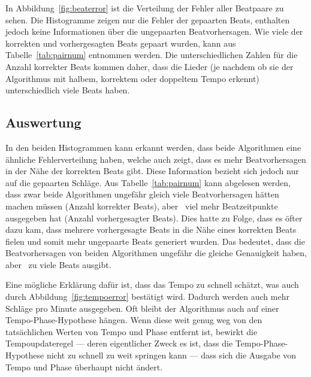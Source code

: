{{		In Abbildung~\ref{fig:beaterror} ist die Verteilung der Fehler aller Beatpaare zu sehen.
		Die Histogramme zeigen nur die Fehler der gepaarten Beats,
			enthalten jedoch keine Informationen über die ungepaarten Beatvorhersagen.
		Wie viele der korrekten und vorhergesagten Beats gepaart wurden,
			kann aus Tabelle~\ref{tab:pairnum} entnommen werden.
		Die unterschiedlichen Zahlen für die Anzahl korrekter Beats kommen daher,
			dass die Lieder
			(je nachdem ob sie der Algorithmus mit halbem, korrektem oder doppeltem Tempo erkennt)
			unterschiedlich viele Beats haben.
	}

	\subsection{Auswertung}
	{
		In den beiden Histogrammen kann erkannt werden,
			dass beide Algorithmen eine ähnliche Fehlerverteilung haben,
			welche auch zeigt,
			dass es mehr Beatvorhersagen in der Nähe der korrekten Beats gibt.
		Diese Information bezieht sich jedoch nur auf die gepaarten Schläge.
		Aus Tabelle~\ref{tab:pairnum} kann abgelesen werden,
			dass zwar beide Algorithmen ungefähr gleich viele Beatvorhersagen hätten machen müssen (Anzahl korrekter Beats),
			aber~\cite{2011_PlRoSt} viel mehr Beatzeitpunkte ausgegeben hat (Anzahl vorhergesagter Beats).
		Dies hatte zu Folge,
			dass es öfter dazu kam,
			dass mehrere vorhergesagte Beats in die Nähe eines korrekten Beats fielen
			und somit mehr ungepaarte Beats generiert wurden.
		Das bedeutet,
			dass die Beatvorhersagen von beiden Algorithmen ungefähr die gleiche Genauigkeit haben,
			aber~\cite{2011_PlRoSt} zu viele Beats ausgibt.

		Eine mögliche Erklärung dafür ist,
			dass \cite{2011_PlRoSt} das Tempo zu schnell schätzt,
			was auch durch Abbildung~\ref{fig:tempoerror} bestätigt wird.
		Dadurch werden auch mehr Schläge pro Minute ausgegeben.
		Oft bleibt der Algorithmus auch auf einer Tempo-Phase-Hypothese hängen.
		Wenn diese weit genug weg von den tatsächlichen Werten von Tempo und Phase entfernt ist,
			bewirkt die Tempoupdateregel ---
			deren eigentlicher Zweck es ist,
			dass die Tempo-Phase-Hypothese nicht zu schnell zu weit springen kann ---
			dass sich die Ausgabe von Tempo und Phase überhaupt nicht ändert.
	}
}

